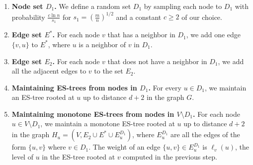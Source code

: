 \documentclass[11pt]{article}
\theoremstyle{definition}
\theoremstyle{remark}
\begin{document}
\begin{titlepage}
\begin{enumerate}
    \item \textbf{Node set $D_1$.} We define a random set $D_1$ by sampling each node to $D_1$ with probability $\frac{c\ln{n}}{s_1}$ for $s_1= (\frac{m}{n})^{1/2}$ and a constant $c \geq 2$ of our choice.
    \item \textbf{Edge set $E^*$.} For each node $v$ that has a neighbor in $D_1$, we add one edge $\{v,u\}$ to $E^*$, where $u$ is a neighbor of $v$ in $D_1$.
    \item \textbf{Edge set $E_2$.} For each node $v$ that does not have a neighbor in $D_1$, we add all the adjacent edges to $v$ to the set $E_2$.
    \item \textbf{Maintaining ES-trees from nodes in $D_1$.} For every $u \in D_1$, we maintain an ES-tree rooted at $u$ up to distance $d+2$ in the graph $G$.
    \item \textbf{Maintaining monotone ES-trees from nodes in $V \setminus D_1$.} For each node $u \in V \setminus D_1$, we maintain a monotone ES-tree rooted at $u$ up to distance $d+2$ in the graph $H_u = (V,E_2 \cup E^* \cup E_u^{D_1})$, where $E_u^{D_1}$ are all the edges of the form $\{u,v\}$ where $v \in D_1$. The weight of an edge $\{u,v\} \in E_u^{D_1}$ is $\ell_v(u)$, the level of $u$ in the ES-tree rooted at $v$ computed in the previous step.
\end{enumerate}



\end{titlepage}
\end{document}
